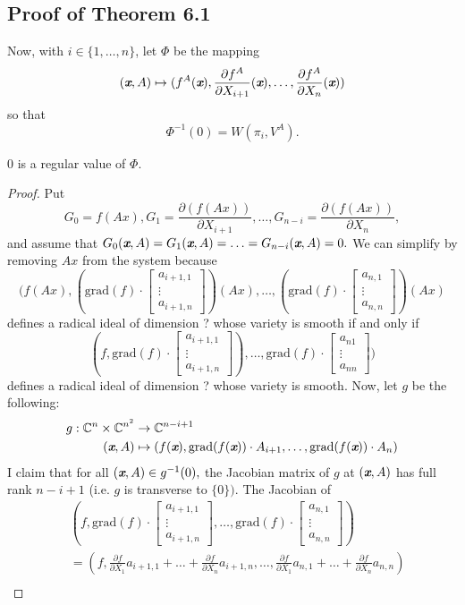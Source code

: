 \documentclass[sigconf]{acmart}
\def\xb{\textit{\textbf{x}}}
\def\C{\mathbb{C}}
\def\grad{\textrm{grad}}
\def\pa{\partial}
\def\bbm{\begin{bmatrix}}
\def\ebm{\end{bmatrix}}
\begin{document}
\subsection{Proof of Theorem 6.1}
Now, with $i \in \{1,\hdots,n\}$, let $\Phi$ be the mapping \[(\xb,A) \mapsto (f^A(\xb), \frac{\partial f^A}{\partial X_{i+1}}(\xb),\hdots,
\frac{\partial f^A}{\partial X_n}(\xb))\] so that 
\[
\Phi^{-1}(0)= W(\pi_i,V^A).
\]
\begin{proposition} 
0 is a regular value of $\Phi$.
\end{proposition}
\begin{proof}
Put
\[
G_0 = f(Ax), 
G_1 = \frac{\partial (f(Ax))}{\partial X_{i+1}},\hdots,G_{n-i} = \frac{\partial (f(Ax))}{\partial X_n},
\] 
and assume that $G_0(\xb,A)=G_1(\xb,A)=\hdots =G_{n-i}(\xb,A)=0.$ We can simplify by removing $Ax$ from the system because  
\[(f(Ax),(\grad(f)\cdot 
\bbm 
a_{i+1,1} \\
\vdots \\
a_{i+1,n} 
\ebm)(Ax),\hdots, 
(\grad(f)\cdot 
\bbm 
a_{n,1} \\
\vdots \\
a_{n,n} 
\ebm)(Ax)
\] 
defines a radical ideal of dimension ? whose variety is smooth if and only if 
\[(f,\grad(f)\cdot 
\bbm 
a_{i+1,1} \\
\vdots \\
a_{i+1,n} 
\ebm),\hdots, 
\grad(f)\cdot 
\bbm 
a_{n1} \\
\vdots \\
a_{nn} 
\ebm)
\]
defines a radical ideal of dimension ? whose variety is smooth. Now, let $g$ be the following:
%
%
\begin{align*}
    g: \C^n \times \C^{n^2} &\rightarrow \C^{n-i+1} \\
       (\xb,A) &\mapsto 
       \left(f(\xb),\grad(f(\xb))\cdot 
A_{i+1},\hdots, 
\grad(f(\xb))\cdot 
A_{n}
\right)
\end{align*}
%
%
I claim that for all $(\xb,A) \in g^{-1}(0),$ the Jacobian matrix of $g$ at $(\xb,A)$ has full rank $n-i+1$ (i.e. $g$ is transverse to $\{0\}).$ The Jacobian of 
\begin{align*}
       & \left(f,\grad(f)\cdot 
\bbm 
a_{i+1,1} \\
\vdots \\
a_{i+1,n} 
\ebm,\hdots, 
\grad(f)\cdot 
\bbm 
a_{n,1} \\
\vdots \\
a_{n,n} 
\ebm\right) \\
&= \left(f, \frac{\pa f}{\pa X_1} a_{i+1,1} + \hdots + \frac{\pa f}{\pa X_n}a_{i+1,n}, \hdots, \frac{\pa f}{\pa X_1} a_{n,1} + \hdots + \frac{\pa f}{\pa X_n}a_{n,n}\right) \\

\end{align*}
\end{proof}
\end{document}
